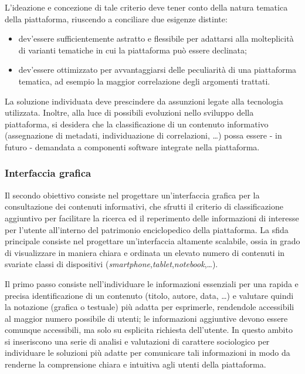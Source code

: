 L'ideazione e concezione di tale criterio deve tener conto della natura tematica della piattaforma, riuscendo a conciliare due esigenze distinte:
\begin{itemize}
\item dev'essere sufficientemente astratto e flessibile per adattarsi alla molteplicità di varianti tematiche in cui la piattaforma può essere declinata;
\item dev'essere ottimizzato per avvantaggiarsi delle peculiarità di una piattaforma tematica, ad esempio la maggior correlazione degli argomenti trattati.
\end{itemize}

La soluzione individuata deve prescindere da assunzioni legate alla tecnologia utilizzata. Inoltre, alla luce di possibili evoluzioni nello sviluppo della piattaforma, si desidera che la classificazione di un contenuto informativo (assegnazione di metadati, individuazione di correlazioni, \ldots) possa essere - in futuro - demandata a componenti software integrate nella piattaforma.

\subsubsection{Interfaccia grafica}
\label{sec:tesi:stage:piano:obiettivi:interfaccia}
Il secondo obiettivo consiste nel progettare un'interfaccia grafica per la consultazione dei contenuti informativi, che sfrutti il criterio di classificazione aggiuntivo per facilitare la ricerca ed il reperimento delle informazioni di interesse per l'utente all'interno del patrimonio enciclopedico della piattaforma. La sfida principale consiste nel progettare un'interfaccia altamente scalabile, ossia in grado di visualizzare in maniera chiara e ordinata un elevato numero di contenuti in svariate classi di dispositivi (\textit{smartphone},\textit{tablet},\textit{notebook},\ldots).

Il primo passo consiste nell'individuare le informazioni essenziali per una rapida e precisa identificazione di un contenuto (titolo, autore, data, \ldots) e valutare quindi la notazione (grafica o testuale) più adatta per esprimerle, rendendole accessibili al maggior numero possibile di utenti; le informazioni aggiuntive devono essere comunque accessibili, ma solo su esplicita richiesta dell'utente. In questo ambito si inseriscono una serie di analisi e valutazioni di carattere sociologico per individuare le soluzioni più adatte per comunicare tali informazioni in modo da renderne la comprensione chiara e intuitiva agli utenti della piattaforma.

